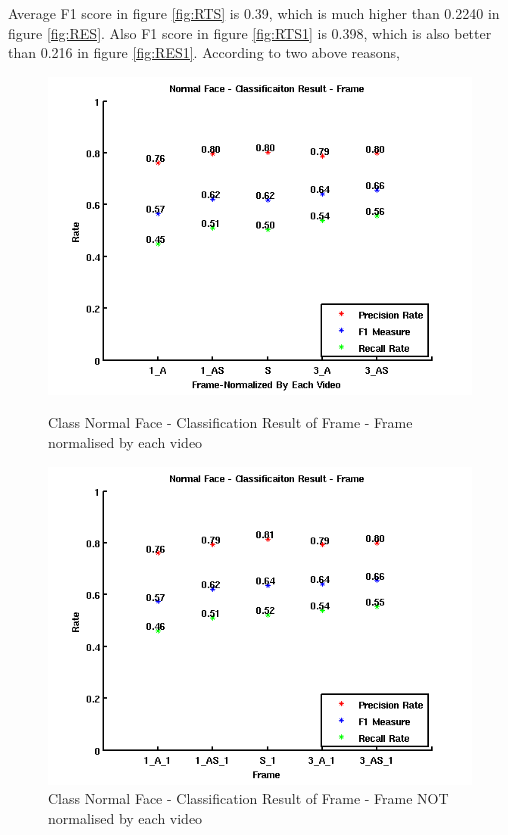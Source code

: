 Average F1 score in figure \ref{fig:RTS} is 0.39, which is much higher than 0.2240 in figure \ref{fig:RES}. Also F1 score in figure \ref{fig:RTS1} is 0.398, which is also better than 0.216 in figure \ref{fig:RES1}. According to two above reasons, 
\begin{figure}[ht]
\centering
\begin{minipage}{.5\textwidth}
  \centering
  \captionsetup{justification=centering,margin=1cm}
  \includegraphics[width=\linewidth]{imgs/Result_NormalFace_Frame.png}
  \caption{Class Normal Face - Classification Result of Frame - Frame normalised by each video}
  \label{fig:RNF}
\end{minipage}%
\begin{minipage}{.5\textwidth}
  \centering
  \captionsetup{justification=centering,margin=1cm}
  \includegraphics[width=\linewidth]{imgs/Result_NormalFace_Frame_1.png}
  \caption{Class Normal Face - Classification Result of Frame - Frame NOT normalised by each video}
  \label{fig:RNF1}
\end{minipage}
\end{figure}

